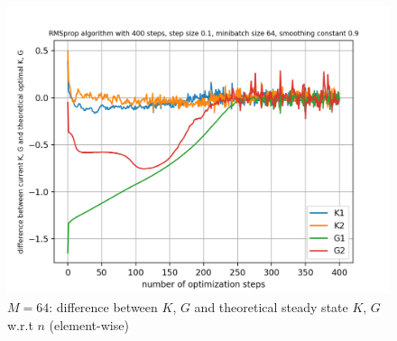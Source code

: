 \documentclass{article}
\begin{document}
\begin{figure}[h!]
\begin{minipage}[t]{.28\paperwidth}
		\includegraphics[width=1.0\textwidth]{Figures/d_M64_sep.png}
		\caption{$M=64$: difference between $K$, $G$ and theoretical steady state $K$, $G$ w.r.t $n$ (element-wise)}
	\end{minipage}
\end{figure}
\end{document}
